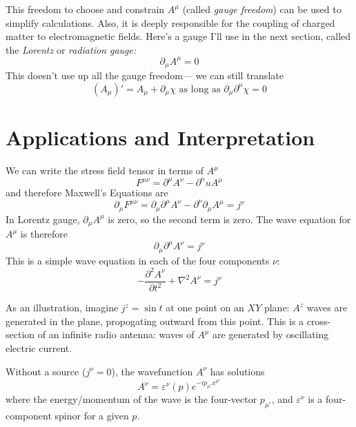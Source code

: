 \documentclass[12pt]{article}
\begin{document}
This freedom to choose and constrain $A^\mu$ (called {\it gauge
freedom}) can be used to simplify calculations.  Also, it is deeply
responsible for the coupling of charged matter to electromagnetic
fields.  Here's a gauge I'll use in the next section, called the {\it
Lorentz} or {\it radiation gauge:}
\begin{equation}
  \partial_\mu A^\mu = 0
  \label{gauge}
\end{equation}
This doesn't use up all the gauge freedom--- we can still translate
\begin{equation}
  (A_\mu)' = A_\mu + \partial_\mu \chi \mbox{ as long as } \partial_\mu \partial^\mu \chi = 0
  \label{aslongas}
\end{equation}

\section{Applications and Interpretation}

We can write the stress field tensor in terms of $A^\mu$
\begin{equation}
  F^{\mu\nu} = \partial^\mu A^\nu - \partial^nu A^\mu
\end{equation}
and therefore Maxwell's Equations are
\begin{equation}
  \partial_\mu F^{\mu\nu} = \partial_\mu \partial^\mu A^\nu - \partial^\nu \partial_\mu A^\mu = j^\nu
\end{equation}
In Lorentz gauge, $\partial_\mu A^\mu$ is zero, so the second term is
zero.  The wave equation for $A^\mu$ is therefore
\begin{equation}
  \partial_\mu \partial^\mu A^\nu = j^\nu
  \label{inhomogeneous}
\end{equation}
This is a simple wave equation in each of the four components $\nu$:
\begin{equation}
  -\frac{\partial^2 A^\nu}{\partial t^2} + \nabla^2 A^\nu = j^\nu
\end{equation}

As an illustration, imagine $j^z = \sin t$ at one point on an $XY$
plane: $A^z$ waves are generated in the plane, propogating outward
from this point.  This is a cross-section of an infinite radio
antenna: waves of $A^\mu$ are generated by oscillating electric
current.

Without a source ($j^\nu = 0$), the wavefunction $A^\nu$ has solutions
\begin{equation}
  A^\nu = \varepsilon^\nu(p) e^{-i p_{\mu'} x^{\mu'}}
  \label{solution}
\end{equation}
where the energy/momentum of the wave is the four-vector $p_{\mu'}$,
and $\varepsilon^\nu$ is a four-component spinor for a given $p$.
\end{document}
